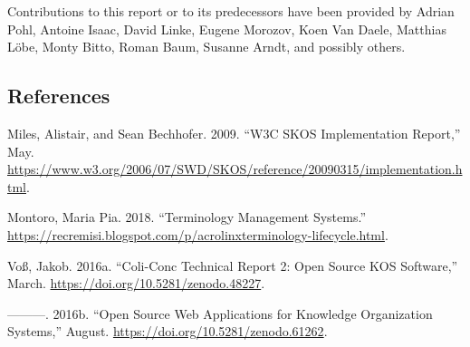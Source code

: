 \documentclass[
  DIV=10]{article}
\newlength{\cslhangindent}
\newenvironment{CSLReferences}[2] %
 {\begin{list}{}{%
  \setlength{\itemindent}{0pt}
  \setlength{\leftmargin}{0pt}
  \setlength{\parsep}{0pt}
  \ifodd #1
   \setlength{\leftmargin}{\cslhangindent}
   \setlength{\itemindent}{-1\cslhangindent}
  \fi
  \setlength{\itemsep}{#2\baselineskip}}}
 {\end{list}}
\begin{document}
Contributions to this report or to its predecessors have been provided
by Adrian Pohl, Antoine Isaac, David Linke, Eugene Morozov, Koen Van
Daele, Matthias Löbe, Monty Bitto, Roman Baum, Susanne Arndt, and
possibly others.

\subsection{References}\label{references}

\label{refs}
\begin{CSLReferences}{1}{0}
Miles, Alistair, and Sean Bechhofer. 2009. {``W3C SKOS Implementation
Report,''} May.
\url{https://www.w3.org/2006/07/SWD/SKOS/reference/20090315/implementation.html}.

Montoro, Maria Pia. 2018. {``Terminology Management Systems.''}
\url{https://recremisi.blogspot.com/p/acrolinxterminology-lifecycle.html}.

Voß, Jakob. 2016a. {``Coli-Conc {Technical} {Report} 2: {Open} {Source}
{KOS} Software,''} March. \url{https://doi.org/10.5281/zenodo.48227}.

---------. 2016b. {``Open {Source} Web Applications for {Knowledge}
{Organization} {Systems},''} August.
\url{https://doi.org/10.5281/zenodo.61262}.

\end{CSLReferences}
\end{document}
